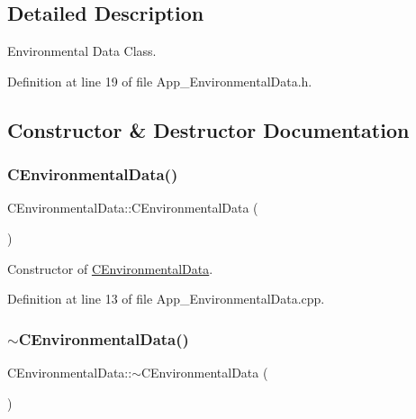 \subsection{Detailed Description}
Environmental Data Class. 

Definition at line 19 of file App\+\_\+\+Environmental\+Data.\+h.



\subsection{Constructor \& Destructor Documentation}
\mbox{\label{class_c_environmental_data_a93b5c52fc18b109c6f1de9d3a5007033}} 
\subsubsection{\texorpdfstring{C\+Environmental\+Data()}{CEnvironmentalData()}}
{\footnotesize\ttfamily C\+Environmental\+Data\+::\+C\+Environmental\+Data (\begin{DoxyParamCaption}{ }\end{DoxyParamCaption})}



Constructor of \mbox{\hyperlink{class_c_environmental_data}{C\+Environmental\+Data}}. 



Definition at line 13 of file App\+\_\+\+Environmental\+Data.\+cpp.

\mbox{\label{class_c_environmental_data_a9ec6952d01bbc0b5813889237535b71d}} 
\subsubsection{\texorpdfstring{$\sim$\+C\+Environmental\+Data()}{~CEnvironmentalData()}}
{\footnotesize\ttfamily C\+Environmental\+Data\+::$\sim$\+C\+Environmental\+Data (\begin{DoxyParamCaption}{ }\end{DoxyParamCaption})}




